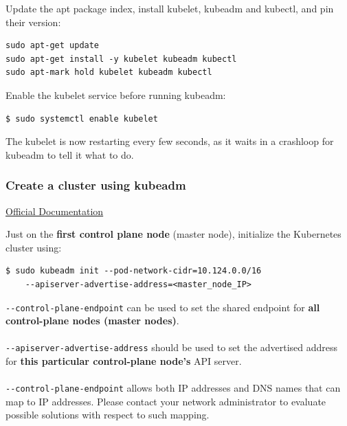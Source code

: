 \documentclass{article}
\newenvironment{blocktemplateII}[1]{%
    \tcolorbox[beamer,%
    noparskip,breakable,
    colframe=Green,%
    colbacklower=LimeGreen!75!LightGreen,%
    title=#1]}%
    {\endtcolorbox}
\newenvironment{codetemplate}[1][]{%
  \mybasecolorbox[#1]
  \itshape
}{%
  \endmybasecolorbox
}
\begin{document}
Update the apt package index, install kubelet, kubeadm and kubectl, and pin their version:
\begin{codetemplate}{}
\begin{verbatim}
sudo apt-get update
sudo apt-get install -y kubelet kubeadm kubectl
sudo apt-mark hold kubelet kubeadm kubectl
\end{verbatim}
\end{codetemplate}

Enable the kubelet service before running kubeadm:
\begin{codetemplate}{}
\begin{verbatim}
$ sudo systemctl enable kubelet
\end{verbatim}
\end{codetemplate}

\begin{blocktemplateII}{NOTE}
The kubelet is now restarting every few seconds, as it waits in a crashloop for kubeadm to tell it what to do.
\end{blocktemplateII}

\subsubsection{Create a cluster using kubeadm}
\href{https://kubernetes.io/docs/setup/production-environment/tools/kubeadm/create-cluster-kubeadm/}{Official Documentation}

Just on the \textbf{first control plane node} (master node), initialize the Kubernetes cluster using:
\begin{codetemplate}{}
\begin{verbatim}
$ sudo kubeadm init --pod-network-cidr=10.124.0.0/16
    --apiserver-advertise-address=<master_node_IP>
\end{verbatim}
\end{codetemplate}

\begin{blocktemplateII}{NOTE}
\verb|--control-plane-endpoint| can be used to set the shared endpoint for \textbf{all control-plane nodes (master nodes)}.
\\\\
\verb|--apiserver-advertise-address| should be used to set the advertised address for \textbf{this particular control-plane node's} API server.
\\\\
\verb|--control-plane-endpoint| allows both IP addresses and DNS names that can map to IP addresses. Please contact your network administrator to evaluate possible solutions with respect to such mapping.
\end{blocktemplateII}
\end{document}
